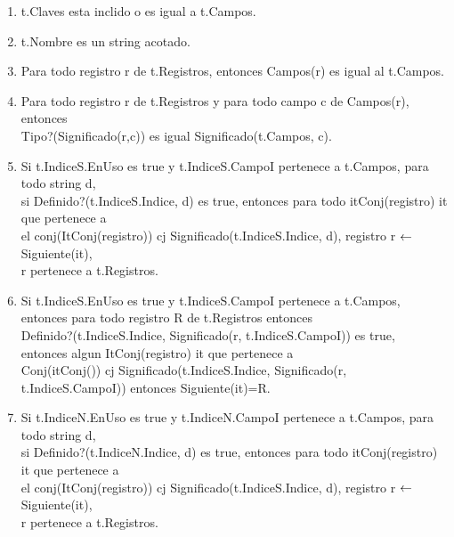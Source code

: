\begin{enumerate}
\item	t.Claves esta inclido o es igual a t.Campos.
% 
\item	t.Nombre es un string acotado.
\item	Para todo registro r de t.Registros, entonces Campos(r) es igual al t.Campos.
\item	Para todo registro r de t.Registros y para todo campo c de Campos(r), entonces \\
Tipo?(Significado(r,c)) es igual Significado(t.Campos, c).

\item	Si t.IndiceS.EnUso es true y t.IndiceS.CampoI pertenece a t.Campos, para todo string d, \\
si Definido?(t.IndiceS.Indice, d) es true, entonces para todo itConj(registro) it que pertenece a \\
el conj(ItConj(registro)) cj Significado(t.IndiceS.Indice, d), registro r $\leftarrow$Siguiente(it), \\
r pertenece a t.Registros.

\item	Si t.IndiceS.EnUso es true y t.IndiceS.CampoI pertenece a t.Campos, \\
entonces para todo registro R de t.Registros entonces \\
Definido?(t.IndiceS.Indice, Significado(r, t.IndiceS.CampoI)) es true, \\
entonces algun ItConj(registro) it que pertenece a \\
Conj(itConj()) cj Significado(t.IndiceS.Indice, Significado(r, t.IndiceS.CampoI)) entonces Siguiente(it)=R.

\item	Si t.IndiceN.EnUso es true y t.IndiceN.CampoI pertenece a t.Campos, para todo string d, \\
si Definido?(t.IndiceN.Indice, d) es true, entonces para todo itConj(registro) it que pertenece a \\
el conj(ItConj(registro)) cj Significado(t.IndiceS.Indice, d), registro r $\leftarrow$Siguiente(it), \\
r pertenece a t.Registros.


\end{enumerate}
